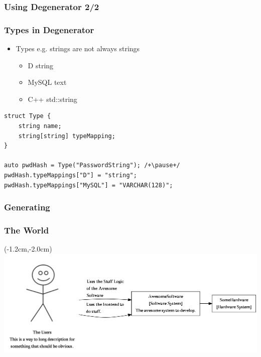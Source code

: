\documentclass[xelatex,13pt]{beamer}
\begin{document}
\begin{frame}
	\frametitle{Using Degenerator 2/2}
	
	\pause
	
	\pause
	
	\pause
	
\end{frame}

\begin{frame}[fragile]
	\frametitle{Types in Degenerator}
	\begin{itemize}
		\item Types \pause e.g. strings are not always strings
		\pause
		\begin{itemize}
			\item D string
			\item MySQL text
			\item C++ std::string
		\end{itemize}
	\end{itemize}
	\pause
	\begin{lstlisting}[basicstyle=\scriptsize]
struct Type {
    string name;
    string[string] typeMapping;
}

auto pwdHash = Type("PasswordString"); /+\pause+/
pwdHash.typeMappings["D"] = "string";
pwdHash.typeMappings["MySQL"] = "VARCHAR(128)";
\end{lstlisting}
	\vspace{-1cm}
\end{frame}

\begin{frame}
	\frametitle{Generating}
	
\end{frame}

\begin{frame}
	\frametitle{The World}
	\begin{textblock*}{0cm}(-1.2cm,-2.0cm)
		\includegraphics[width=1.0\paperwidth]{theworld.png}
	\end{textblock*}
\end{frame}
\end{document}
